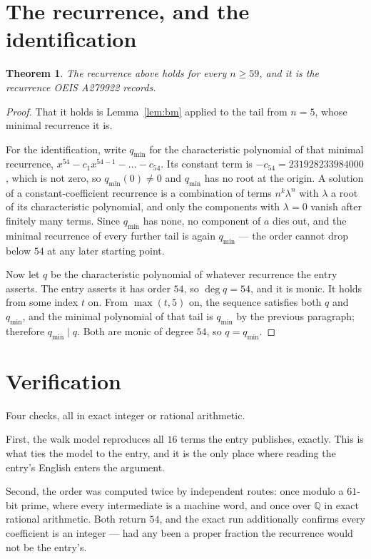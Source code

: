 \documentclass[11pt,a4paper]{article}
\theoremstyle{plain}
\newtheorem{theorem}{Theorem}
\theoremstyle{definition}
\begin{document}
\section{The recurrence, and the identification}

\begin{theorem}
The recurrence above holds for every $n\ge59$, and it is the recurrence OEIS A279922 records.
\end{theorem}

\begin{proof}
That it holds is Lemma~\ref{lem:bm} applied to the tail from $n=5$, whose minimal
recurrence it is.

For the identification, write $q_{\min}$ for the characteristic polynomial of that minimal
recurrence, $x^{54}-c_1x^{54-1}-\dots-c_{54}$. Its constant term is
$-c_{54}=231928233984000$, which is not zero, so $q_{\min}(0)\neq0$ and $q_{\min}$ has no
root at the origin. A solution of a constant-coefficient recurrence is a combination of terms
$n^{k}\lambda^{n}$ with $\lambda$ a root of its characteristic polynomial, and only the
components with $\lambda=0$ vanish after finitely many terms. Since $q_{\min}$ has none, no
component of $a$ dies out, and the minimal recurrence of every further tail is again
$q_{\min}$ --- the order cannot drop below $54$ at any later starting point.

Now let $q$ be the characteristic polynomial of whatever recurrence the entry asserts. The
entry asserts it has order $54$, so $\deg q=54$, and it is monic. It holds from some
index $t$ on. From $\max(t,5)$ on, the sequence satisfies both $q$ and $q_{\min}$, and
the minimal polynomial of that tail is $q_{\min}$ by the previous paragraph; therefore
$q_{\min}\mid q$. Both are monic of degree $54$, so $q=q_{\min}$.
\end{proof}

\section{Verification}

Four checks, all in exact integer or rational arithmetic.

First, the walk model reproduces all $16$ terms the entry publishes, exactly. This is
what ties the model to the entry, and it is the only place where reading the entry's English
enters the argument.

Second, the order was computed twice by independent routes: once modulo a $61$-bit prime, where
every intermediate is a machine word, and once over $\mathbb{Q}$ in exact rational arithmetic.
Both return $54$, and the exact run additionally confirms every coefficient is an integer
--- had any been a proper fraction the recurrence would not be the entry's.
\end{document}

